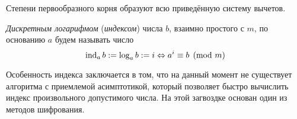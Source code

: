 \begin{note}
	Степени первообразного корня образуют всю приведённую систему вычетов.
\end{note}

\begin{definition}
	\textit{Дискретным логарифмом} (\textit{индексом}) числа $b$, взаимно простого с $m$, по основанию $a$ будем называть число
	\[
		\operatorname{ind}_a b := \log_a b := i \Leftrightarrow a^i \equiv b \pmod m
	\]
\end{definition}

\begin{note}
	Особенность индекса заключается в том, что на данный момент не существует алгоритма с приемлемой асимптотикой, который позволяет быстро вычислить индекс произвольного допустимого числа. На этой загвоздке основан один из методов шифрования.
\end{note}